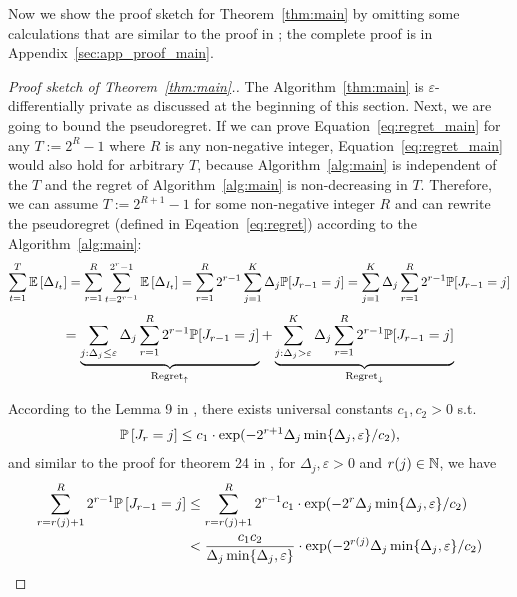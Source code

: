 Now we show the proof sketch for Theorem~\ref{thm:main} by omitting some calculations that are similar to the proof in \citet{hu2024open}; the complete proof is in Appendix~\ref{sec:app_proof_main}.
\begin{proof}[Proof sketch of Theorem~\ref{thm:main}.]
The Algorithm~\ref{thm:main} is $\varepsilon$-differentially private as discussed at the beginning of this section. Next, we are going to bound the pseudoregret.
If we can prove Equation~\ref{eq:regret_main} for any $T:=2^{R}-1$ where $R$ is any non-negative integer, Equation~\ref{eq:regret_main} would also hold for arbitrary $T$, because Algorithm~\ref{alg:main} is independent of the $T$ and the regret of Algorithm~\ref{alg:main} is non-decreasing in $T$.
Therefore, we can assume $T:=2^{R+1}-1$ for some non-negative integer $R$ and can rewrite the pseudoregret (defined in Eqeation~\ref{eq:regret}) according to the Algorithm~\ref{alg:main}:
$$
\sum_{t=1}^T \mathbb{E}\left[\Delta_{I_t}\right] = \sum_{r=1}^{R} \sum_{t=2^{r-1}}^{2^{r}-1}\mathbb{E}\left[\Delta_{I_t}\right] = \sum_{r=1}^{R} 2^{r-1}\sum_{j=1}^{K}\Delta_{j}\mathbb{P}[J_{r-1} = j] = \sum_{j=1}^{K}\Delta_{j}\sum_{r=1}^{R} 2^{r-1}\mathbb{P}[J_{r-1} = j]
$$
$$ 
 = \underbrace{\sum_{j:\Delta_j\leq \varepsilon}\Delta_{j}\sum_{r=1}^{R} 2^{r-1}\mathbb{P}[J_{r-1} = j]}_{\text{Regret}_{\uparrow}} + \underbrace{\sum_{j:\Delta_j > \varepsilon}^{K}\Delta_{j}\sum_{r=1}^{R} 2^{r-1}\mathbb{P}[J_{r-1} = j]}_{\text{Regret}_{\downarrow}}
$$

According to the Lemma 9 in \citet{hu2021near}, there exists universal constants $c_1, c_2>0$ s.t.
	\begin{align}
	\label{eq:tail_main}
	\mathbb{P}\left[J_r = j\right]\leq c_1\cdot \exp(-2^{r+1}\Delta_j \min\{\Delta_j, \varepsilon\} / c_2),
	\end{align}
and similar to the proof for theorem 24 in \citet{hu2021near}, for $\Delta_j, \varepsilon > 0$ and $r(j)\in \mathbb{N}$, we have
\begin{align*}
	\sum_{r=r(j)+1}^{R}2^{r-1}\mathbb{P}\left[J_{r-1} = j\right] 
	&\leq \sum_{r=r(j)+1}^{R}2^{r-1} c_1\cdot \exp(-2^r\Delta_j \min\{\Delta_j, \varepsilon\} / c_2)\nonumber\\
	&< \frac{c_1c_2}{\Delta_j \min\{\Delta_j, \varepsilon\}}\cdot \exp(-2^{r(j)}\Delta_j \min\{\Delta_j, \varepsilon\} / c_2)
\end{align*}


\end{proof}
